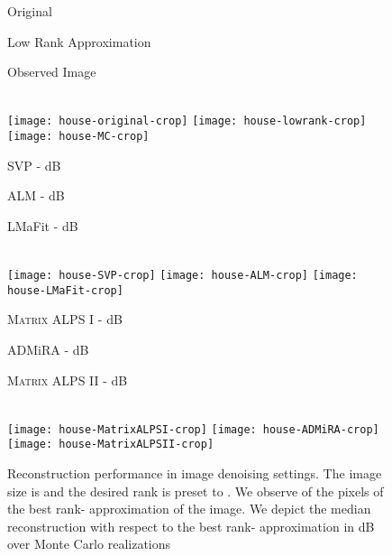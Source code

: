 \documentclass[twocolumn]{svjour3}
\begin{document}
\begin{figure*}[!htp]
\centering
\begin{minipage}{0.28\linewidth}
\centering \normalsize{Original}
\end{minipage} 
\begin{minipage}{0.28\linewidth}
\centering \normalsize{Low Rank Approximation}
\end{minipage}
\begin{minipage}{0.28\linewidth}
\centering \normalsize{Observed Image}
\end{minipage} \vspace{0.1cm}\\

\texttt{[image: house-original-crop]} 
\texttt{[image: house-lowrank-crop]} 
\texttt{[image: house-MC-crop]}\\

\centering
\begin{minipage}{0.28\linewidth}
\centering \normalsize{SVP -  dB}
\end{minipage} 
\begin{minipage}{0.28\linewidth}
\centering \normalsize{ALM -  dB}
\end{minipage}
\begin{minipage}{0.28\linewidth}
\centering \normalsize{LMaFit -  dB}
\end{minipage} \vspace{0.1cm}\\

\texttt{[image: house-SVP-crop]} 
\texttt{[image: house-ALM-crop]} 
\texttt{[image: house-LMaFit-crop]} \\

\centering
\begin{minipage}{0.28\linewidth}
\centering \normalsize{\textsc{\textsc{Matrix ALPS I}} -  dB}
\end{minipage} 
\begin{minipage}{0.28\linewidth}
\centering \normalsize{ADMiRA -  dB}
\end{minipage}
\begin{minipage}{0.28\linewidth}
\centering \normalsize{\textsc{\textsc{Matrix ALPS II}} -  dB}
\end{minipage} \vspace{0.1cm}\\

\texttt{[image: house-MatrixALPSI-crop]} 
\texttt{[image: house-ADMiRA-crop]} 
\texttt{[image: house-MatrixALPSII-crop]}\\
\caption{\small{Reconstruction performance in image denoising settings. The image size is  and the desired rank is preset to . We observe  of the pixels of the best rank- approximation of the image. We depict the median reconstruction with respect to the best rank- approximation in dB over  Monte Carlo realizations}} {\label{fig:real2}}
\end{figure*}
\end{document}
